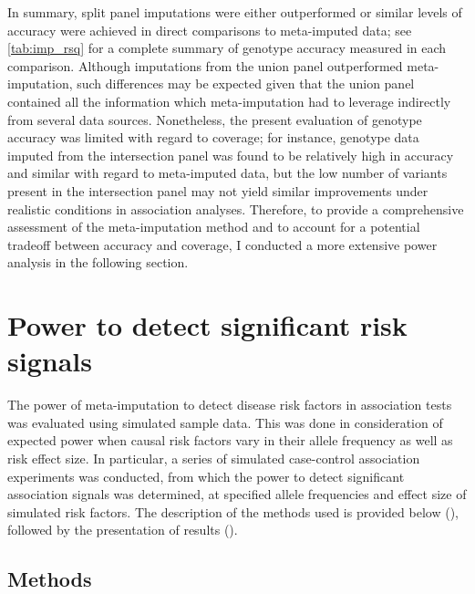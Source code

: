 In summary, split panel imputations were either outperformed or similar levels of accuracy were achieved in direct comparisons to meta-imputed data; see \cref{tab:imp_rsq} for a complete summary of genotype accuracy measured in each comparison.
Although imputations from the union panel outperformed meta-imputation, such differences may be expected given that the union panel contained all the information which meta-imputation had to leverage indirectly from several data sources.
Nonetheless, the present evaluation of genotype accuracy was limited with regard to coverage; for instance, genotype data imputed from the intersection panel was found to be relatively high in accuracy and similar with regard to meta-imputed data, but the low number of variants present in the intersection panel may not yield similar improvements under realistic conditions in association analyses.
Therefore, to provide a comprehensive assessment of the meta-imputation method and to account for a potential tradeoff between accuracy and coverage, I conducted a more extensive power analysis in the following section.



%
\section{Power to detect significant risk signals}
\label{sec:metaimpute_power}
%

The power of meta-imputation to detect disease risk factors in association tests was evaluated using simulated sample data.
This was done in consideration of expected power when causal risk factors vary in their allele frequency as well as risk effect size.
In particular, a series of simulated case-control association experiments was conducted, from which the power to detect significant association signals was determined, at specified allele frequencies and effect size of simulated risk factors.
The description of the methods used is provided below (), followed by the presentation of results ().


%
\subsection{Methods}
\label{sec:meta_power_methods}
%

